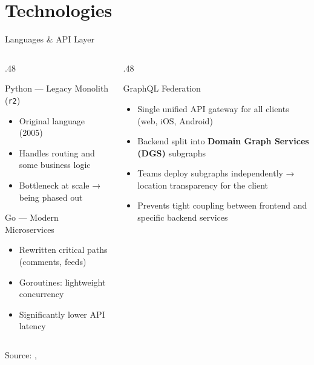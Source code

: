 \documentclass[
  aspectratio=169,
]{beamer}
\begin{document}
\section{Technologies}
\begin{frame}{Languages \& API Layer}
  \begin{columns}[T]
    \begin{column}{.48\textwidth}
      \begin{block}{Python — Legacy Monolith (\texttt{r2})}
        \begin{itemize}
          \item Original language (2005)
          \item Handles routing and some business logic
          \item Bottleneck at scale → being phased out
        \end{itemize}
      \end{block}
      \vspace{2mm}
      \begin{block}{Go — Modern Microservices}
        \begin{itemize}
          \item Rewritten critical paths (comments, feeds)
          \item Goroutines: lightweight concurrency
          \item Significantly lower API latency
        \end{itemize}
      \end{block}
    \end{column}
    \begin{column}{.48\textwidth}
      \begin{block}{GraphQL Federation}
        \begin{itemize}
          \item Single unified API gateway for all clients (web, iOS, Android)
          \item Backend split into \textbf{Domain Graph Services (DGS)} subgraphs
          \item Teams deploy subgraphs independently → \alert{location transparency} for the client
          \item Prevents tight coupling between frontend and specific backend services
        \end{itemize}
      \end{block}
    \end{column}
  \end{columns}
  \vspace{1mm}
  {\footnotesize Source: \cite{stackshare2024reddit}, \cite{himalayas2024reddit}}
\end{frame}
\end{document}
